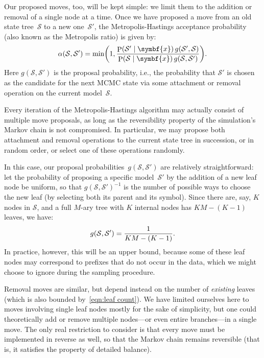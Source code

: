 \documentclass[11pt,a4paper]{article}
\newcommand\mc[1]{\mathcal{#1}}               %
\newcommand\ub[1]{\symbf{#1}}                 %
\DeclareMathOperator\Pb{P}                    %
\DeclarePairedDelimiter\lr{\lparen}{\rparen}  %
\begin{document}
Our proposed moves, too, will be kept simple: we limit them to the addition or
removal of a single node at a time. Once we have proposed a move from an old
state tree~\(\mc{S}\) to a new one~\(\mc{S}'\), the Metropolis-Hastings
acceptance probability (also known as the Metropolis ratio) is given by:
\begin{equation*}
  \alpha\lr{\mc{S}, \mc{S}'} = \min\lr*{1, \frac{\Pb\lr{\mc{S}' \mid \ub{x}}\,
    g\lr{\mc{S}', \mc{S}}}{\Pb\lr{\mc{S} \mid \ub{x}}\, g\lr{\mc{S}, \mc{S}'}}}.
\end{equation*}
Here \(g(\mc{S}, \mc{S}')\) is the proposal probability, i.e., the probability
that \(\mc{S}'\) is chosen as the candidate for the next MCMC state via some
attachment or removal operation on the current model~\(\mc{S}\).

Every iteration of the Metropolis-Hastings algorithm may actually consist of
multiple move proposals, as long as the reversibility property of the
simulation's Markov chain is not compromised. In particular, we may propose both
attachment and removal operations to the current state tree in succession, or in
random order, or select one of these operations randomly.

In this case, our proposal probabilities~\(g(\mc{S}, \mc{S}')\) are relatively
straightforward: let the probability of proposing a specific model~\(\mc{S}'\)
by the addition of a new leaf node be uniform, so that \(g(\mc{S},
\mc{S}')^{-1}\) is the number of possible ways to choose the new leaf (by
selecting both its parent and its symbol). Since there are, say, \(K\) nodes in
\(\mc{S}\), and a full \(M\)-ary tree with \(K\) internal nodes has \(KM -
(K-1)\) leaves, we have:
\begin{equation}\label{eqn:leaf count}
  g\lr{\mc{S}, \mc{S}'} = \frac{1}{KM - (K-1)}.
\end{equation}
In practice, however, this will be an upper bound, because some of these leaf
nodes may correspond to prefixes that do not occur in the data, which we might
choose to ignore during the sampling procedure. 

Removal moves are similar, but depend instead on the number of \emph{existing}
leaves (which is also bounded by~\eqref{eqn:leaf count}). We have limited
ourselves here to moves involving single leaf nodes mostly for the sake of
simplicity, but one could theoretically add or remove multiple nodes---or even
entire branches---in a single move. The only real restriction to consider is
that every move must be implemented in reverse as well, so that the Markov chain
remains reversible (that is, it satisfies the property of detailed balance).
\end{document}
